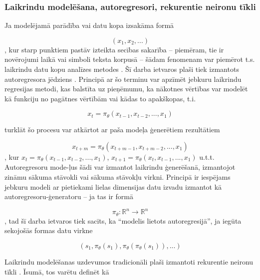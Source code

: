 \documentclass[12pt, a4paper]{article}
\numberwithin{equation}{section} %
\begin{document}
\subsubsection{Laikrindu modelēšana, autoregresori, rekurentie neironu tīkli}

Ja modelējamā parādība vai datu kopa izsakāma formā

\begin{equation} 
    (x_1, x_2, ...)
\end{equation}
, kur starp punktiem pastāv izteikta secības sakarība -- piemēram, tie ir novērojumi laikā vai simboli teksta korpusā -- šādam fenomenam var piemērot t.s. laikrindu datu kopu analīzes metodes \cite{time_series}. Šī darba ietvaros plaši tiek izmantots autoregresora jēdziens \cite{autoregressor}. Principā ar šo terminu var apzīmēt jebkuru laikrindu regresijas metodi, kas balstīta uz pieņēmumu, ka nākotnes vērtības var modelēt kā funkciju no pagātnes vērtībām vai kādas to apakškopas, t.i.

\begin{equation} 
    x_t = \pi_{\theta}(x_{t-1}, x_{t-2}, ..., x_1)
\end{equation}

turklāt šo procesu var atkārtot ar paša modeļa ģenerētiem rezultātiem

\begin{equation} 
    x_{t+m} = \pi_{\theta}(x_{t+m-1}, x_{t+m-2}, ..., x_1)
\end{equation}
, kur $x_{t} =  \pi_{\theta}(x_{t-1}, x_{t-2}, ..., x_1)$, $x_{t+1} =  \pi_{\theta}(x_{t}, x_{t-1}, ..., x_1)$ u.t.t. Autoregresoru mode-ļus šādi var izmantot laikrindu ģenerēšanā, izmantojot zināmu sākuma stāvokli vai sākuma stāvokļu virkni. Principā ir iespējams jebkuru modeli ar pietiekami lielas dimensijas datu izvadu izmantot kā autoregresoru-ģeneratoru -- ja tas ir formā 

\begin{equation} 
    \pi_{\theta}: \mathbb{R}^n \rightarrow \mathbb{R}^n
\end{equation}
, tad šī darba ietvaros tiek sacīts, ka ``modelis lietots autoregresijā'', ja iegūta sekojošās formas datu virkne

\begin{equation} 
    (s_1, \pi_{\theta}(s_1), \pi_{\theta}(\pi_{\theta}(s_1)), ... )
\end{equation}

Laikrindu modelēšanas uzdevumos tradicionāli plaši izmantoti rekurentie neironu tīkli \cite{rnn}. Īsumā, tos varētu definēt kā 
\end{document}

